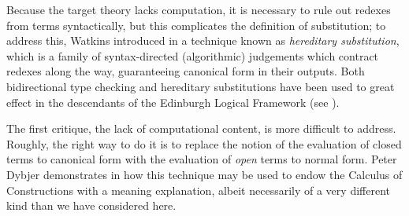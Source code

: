 \documentclass[main.tex]{subfiles}
\begin{document}
Because the target theory lacks computation, it is necessary to rule out
redexes from terms syntactically, but this complicates the definition of
substitution; to address this, Watkins introduced in \cite{watkins} a technique
known as \emph{hereditary substitution}, which is a family of syntax-directed
(algorithmic) judgements which contract redexes along the way, guaranteeing
canonical form in their outputs. Both bidirectional type checking and
hereditary substitutions have been used to great effect in the descendants of
the Edinburgh Logical Framework (see \cite{Harper-Licata-2007}).

The first critique, the lack of computational content, is more difficult to
address. Roughly, the right way to do it is to replace the notion of the
evaluation of closed terms to canonical form with the evaluation of \emph{open}
terms to normal form. Peter Dybjer demonstrates in \cite{series/leus/Dybjer12a}
how this technique may be used to endow the Calculus of Constructions with a
meaning explanation, albeit necessarily of a very different kind than we have
considered here.
\end{document}
